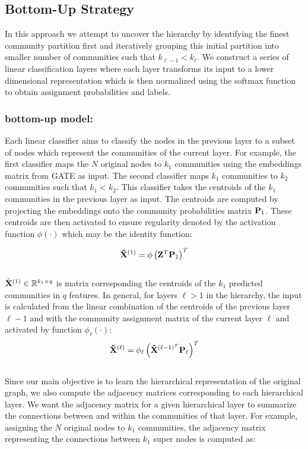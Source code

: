 \documentclass[a4paper,12pt]{article}
\begin{document}
		\subsection{Bottom-Up Strategy} 
			
			In this approach we attempt to uncover the hierarchy by identifying the finest community partition first and iteratively grouping this initial partition into smaller number of communities such that $k_{\ell-1} < k_\ell$. We construct a series of linear classification layers where each layer transforms its input to a lower dimensional representation which is then normalized using the softmax function to obtain assignment probabilities and labels.
				
				\subsubsection*{bottom-up model:} 
				
					Each linear classifier aims to classify the nodes in the previous layer to a subset of nodes which represent the communities of the current layer. For example, the first classifier maps the $N$ original nodes to $k_1$ communities using the embeddings matrix from GATE as input. The second classifier maps $k_1$ communities to $k_2$ communities such that $k_1 < k_2$. This classifier takes the centroids of the $k_1$ communities in the previous layer as input. The centroids are computed by projecting the embeddings onto the community probabilities matrix ${\bf P}_1$. These centroids are then activated to ensure regularity denoted by the activation function $\phi(\cdot)$ which may be the identity function:
					
					\[ {\bf \tilde {X}}^{(1)}= \phi\left({\bf Z}^T {\bf P}_{1}\right)^T\] 
					\\
					 $\tilde{\bf{X}}^{(1)} \in \mathbb{R}^{k_1 \times q}$ is matrix corresponding the centroids of the $k_1$ predicted communities in $q$ features. In general, for layers $\ell > 1$ in the hierarchy, the input is calculated from the linear combination of the centroids of the previous layer $\ell - 1$ and with the community assignment matrix of the current layer $\ell$ and activated by function $\phi_\ell(\cdot)$: 
					\[ {\bf \tilde X}^{(\ell)} = \phi_\ell\left({\bf \tilde{X}}^{(\ell-1)^T} {\bf P}_{\ell}\right)^T\] 
					\\
					
					Since our main objective is to learn the hierarchical representation of the original graph, we also compute the adjacency matrices corresponding to each hierarchical layer. We want the adjacency matrix for a given hierarchical layer to summarize the connections between and within the communities of that layer. For example, assigning the $N$ original nodes to $k_1$ communities, the adjacency matrix representing the connections between $k_1$ super nodes is computed as: 
					
\end{document}
